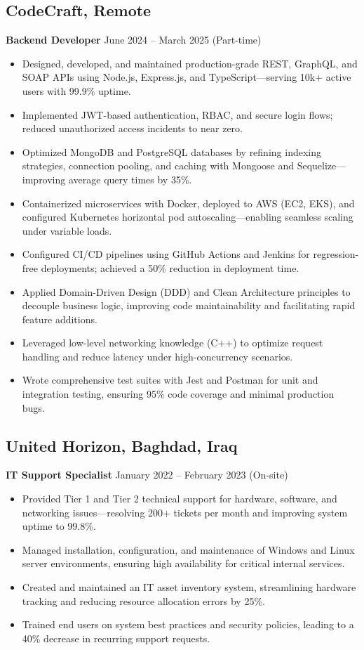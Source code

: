 \documentclass[11pt]{article}
\begin{document}
\subsection*{CodeCraft, Remote}
\textbf{Backend Developer} \hfill June 2024 -- March 2025 (Part-time)\\
\begin{itemize}\itemsep0pt
  \item Designed, developed, and maintained production-grade REST, GraphQL, and SOAP APIs using Node.js, Express.js, and TypeScript—serving 10k+ active users with 99.9\% uptime.
  \item Implemented JWT-based authentication, RBAC, and secure login flows; reduced unauthorized access incidents to near zero.
  \item Optimized MongoDB and PostgreSQL databases by refining indexing strategies, connection pooling, and caching with Mongoose and Sequelize—improving average query times by 35\%.
  \item Containerized microservices with Docker, deployed to AWS (EC2, EKS), and configured Kubernetes horizontal pod autoscaling—enabling seamless scaling under variable loads.
  \item Configured CI/CD pipelines using GitHub Actions and Jenkins for regression-free deployments; achieved a 50\% reduction in deployment time.
  \item Applied Domain-Driven Design (DDD) and Clean Architecture principles to decouple business logic, improving code maintainability and facilitating rapid feature additions.
  \item Leveraged low-level networking knowledge (C++) to optimize request handling and reduce latency under high-concurrency scenarios.
  \item Wrote comprehensive test suites with Jest and Postman for unit and integration testing, ensuring 95\% code coverage and minimal production bugs.
\end{itemize}

\subsection*{United Horizon, Baghdad, Iraq}
\textbf{IT Support Specialist} \hfill January 2022 -- February 2023 (On-site)\\
\begin{itemize}\itemsep0pt
  \item Provided Tier 1 and Tier 2 technical support for hardware, software, and networking issues—resolving 200+ tickets per month and improving system uptime to 99.8\%.
  \item Managed installation, configuration, and maintenance of Windows and Linux server environments, ensuring high availability for critical internal services.
  \item Created and maintained an IT asset inventory system, streamlining hardware tracking and reducing resource allocation errors by 25\%.
  \item Trained end users on system best practices and security policies, leading to a 40\% decrease in recurring support requests.
\end{itemize}
\end{document}
